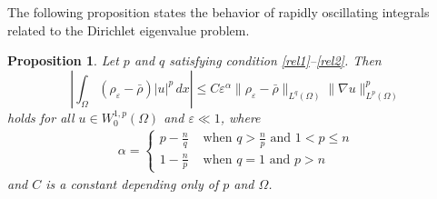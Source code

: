 \documentclass[12pt]{amsart}
\newtheorem{prop}[thm]{Proposition}
\theoremstyle{definition}
\theoremstyle{remark}
\numberwithin{equation}{section}
\begin{document}
The following proposition states the behavior of rapidly oscillating integrals  related to the Dirichlet eigenvalue problem.
\begin{prop} \label{prop.dirichlet}
Let $p$ and $q$ satisfying condition \eqref{rel1}--\eqref{rel2}. Then
$$
\left|\int_\Omega(\rho_\varepsilon-\bar\rho) |u|^p\,dx \right|  \leq   C \varepsilon^\alpha \|\rho_\varepsilon - \bar \rho\|_{L^q(\Omega)}   \|\nabla u\|_{L^p(\Omega)}^p
$$
holds for all $u\in W^{1,p}_0(\Omega)$ and $\varepsilon\ll 1$, where 
\begin{align} \label{alfa}
\alpha=
\begin{cases}
p-\frac{n}{q} & \text{ when } q> \frac{n}{p} \text{ and } 1<p\leq n\\
1-\frac{n}{p} & \text{ when } q= 1 \text{ and } p>n
\end{cases}
\end{align}
and $C$ is a constant depending only of $p$  and $\Omega$.
\end{prop}
\end{document}
